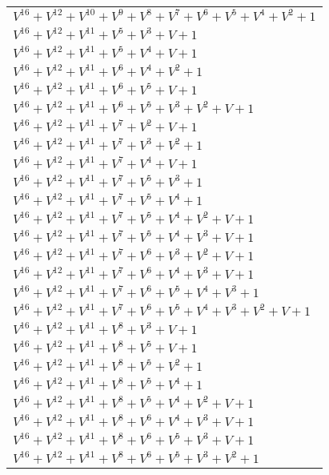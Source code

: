 \documentclass[12pt]{article}
\begin{document}
\begin{adjustwidth}{-4cm}{}
\begin{center}
\begin{longtable}{|l|}
$V^{16}  +V^{12}  +V^{10}  +V^{9}  +V^{8}  +V^{7}  +V^{6}  +V^{5}  +V^{4}  +V^{2}  + 1$ \\
$V^{16}  +V^{12}  +V^{11}  +V^{5}  +V^{3}  + V + 1$ \\
$V^{16}  +V^{12}  +V^{11}  +V^{5}  +V^{4}  + V + 1$ \\
$V^{16}  +V^{12}  +V^{11}  +V^{6}  +V^{4}  +V^{2}  + 1$ \\
$V^{16}  +V^{12}  +V^{11}  +V^{6}  +V^{5}  + V + 1$ \\
$V^{16}  +V^{12}  +V^{11}  +V^{6}  +V^{5}  +V^{3}  +V^{2}  + V + 1$ \\
$V^{16}  +V^{12}  +V^{11}  +V^{7}  +V^{2}  + V + 1$ \\
$V^{16}  +V^{12}  +V^{11}  +V^{7}  +V^{3}  +V^{2}  + 1$ \\
$V^{16}  +V^{12}  +V^{11}  +V^{7}  +V^{4}  + V + 1$ \\
$V^{16}  +V^{12}  +V^{11}  +V^{7}  +V^{5}  +V^{3}  + 1$ \\
$V^{16}  +V^{12}  +V^{11}  +V^{7}  +V^{5}  +V^{4}  + 1$ \\
$V^{16}  +V^{12}  +V^{11}  +V^{7}  +V^{5}  +V^{4}  +V^{2}  + V + 1$ \\
$V^{16}  +V^{12}  +V^{11}  +V^{7}  +V^{5}  +V^{4}  +V^{3}  + V + 1$ \\
$V^{16}  +V^{12}  +V^{11}  +V^{7}  +V^{6}  +V^{3}  +V^{2}  + V + 1$ \\
$V^{16}  +V^{12}  +V^{11}  +V^{7}  +V^{6}  +V^{4}  +V^{3}  + V + 1$ \\
$V^{16}  +V^{12}  +V^{11}  +V^{7}  +V^{6}  +V^{5}  +V^{4}  +V^{3}  + 1$ \\
$V^{16}  +V^{12}  +V^{11}  +V^{7}  +V^{6}  +V^{5}  +V^{4}  +V^{3}  +V^{2}  + V + 1$ \\
$V^{16}  +V^{12}  +V^{11}  +V^{8}  +V^{3}  + V + 1$ \\
$V^{16}  +V^{12}  +V^{11}  +V^{8}  +V^{5}  + V + 1$ \\
$V^{16}  +V^{12}  +V^{11}  +V^{8}  +V^{5}  +V^{2}  + 1$ \\
$V^{16}  +V^{12}  +V^{11}  +V^{8}  +V^{5}  +V^{4}  + 1$ \\
$V^{16}  +V^{12}  +V^{11}  +V^{8}  +V^{5}  +V^{4}  +V^{2}  + V + 1$ \\
$V^{16}  +V^{12}  +V^{11}  +V^{8}  +V^{6}  +V^{4}  +V^{3}  + V + 1$ \\
$V^{16}  +V^{12}  +V^{11}  +V^{8}  +V^{6}  +V^{5}  +V^{3}  + V + 1$ \\
$V^{16}  +V^{12}  +V^{11}  +V^{8}  +V^{6}  +V^{5}  +V^{3}  +V^{2}  + 1$ \\

\end{longtable}
\end{center}
\end{adjustwidth}
\end{document}
